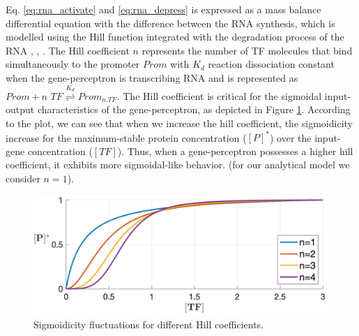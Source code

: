 \documentclass[twocolumn]{biophys-new}
\begin{document}
{{%
 Eq. \ref{eq:rna_activate} and  \ref{eq:rna_depress}  is expressed as a mass balance differential equation with the difference between the RNA synthesis,  which is modelled using the Hill function integrated with the degradation process of the RNA \cite{yugi2019rate}, \cite{alon2019introduction}, \cite{thompson2020multiple}. The Hill coefficient $n$ represents the number of  TF molecules that bind simultaneously to the promoter $Prom$ with $K_d$ reaction dissociation constant when the gene-perceptron is transcribing RNA \cite{santillan2008use} and is represented as $Prom + n \,\, TF \stackrel{K_d}{\rightleftharpoons} Prom_{n.TF}$.
The Hill coefficient is critical for the sigmoidal input-output characteristics of the gene-perceptron, as depicted in Figure \ref{fig: Hill_coeff}. According to the plot, we can see that when we increase the hill coefficient, the sigmoidicity increase for the maximum-stable protein concentration ($[P]^*$) over the input-gene concentration ($[TF]$). Thus, when a gene-perceptron possesses a higher hill coefficient, it exhibits more sigmoidal-like behavior. (for our analytical model we consider $n=1$). 


\begin{figure}[t!] %
\centering
\includegraphics[width=0.9\columnwidth]{figures/hill_coef.pdf}
\caption{Sigmoidicity fluctuations for different Hill coefficients. \vspace{1em}}
\label{fig: Hill_coeff}
\vspace{-0.5em}
\end{figure}

}}
\end{document}
